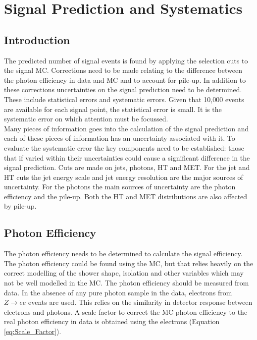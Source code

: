 \chapter{Signal Prediction and Systematics}

\section{Introduction}

The predicted number of signal events is found by applying the selection cuts to
the signal MC. Corrections need to be made relating to the difference between
the photon efficiency in data and MC and to account for pile-up. In addition to
these corrections uncertainties on the signal prediction need to be determined.
These include statistical errors and systematic errors. Given that 10,000 events
are available for each signal point, the statistical error is small. It is the
systematic error on which attention must be focussed. \\

Many pieces of information goes into the calculation of the signal prediction 
and each of these pieces of information has an uncertainty associated with it. 
To evaluate the systematic error the key components need to be established: 
those that if varied within their uncertainties could cause a significant 
difference in the signal prediction. Cuts are made on jets, photons, HT and MET.
For the jet and HT cuts the jet energy scale and jet energy resolution are the
major sources of uncertainty. For the photons the main sources of uncertainty
are the photon efficiency and the pile-up. Both the HT and MET distributions are
also affected by pile-up.

\section{Photon Efficiency}

The photon efficiency needs to be determined to calculate the signal efficiency.
The photon efficiency could be found using the MC, but that relies heavily on
the correct modelling of the shower shape, isolation and other variables which
may not be well modelled in the MC. The photon efficiency should be measured
from data. In the absence of any pure photon sample in the data, electrons from 
$Z\rightarrow ee$ events are used. This relies on the similarity in detector 
response between electrons and photons. A scale factor to correct the MC photon
efficiency to the real photon efficiency in data is obtained using the
electrons (Equation \ref{eq:Scale_Factor}). \\

